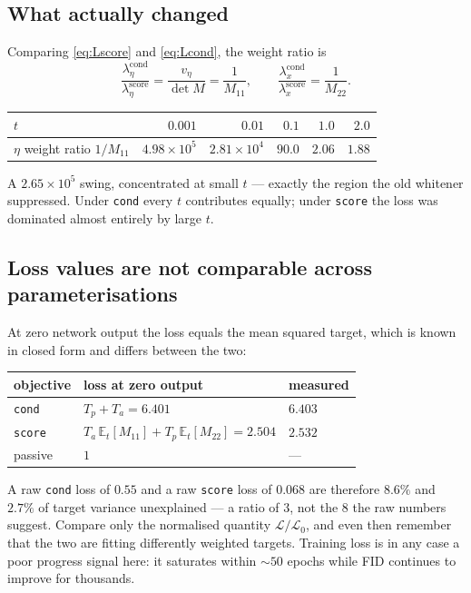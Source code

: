 \documentclass[11pt]{article}
\newcommand{\Tp}{T_p}
\newcommand{\Ta}{T_a}
\begin{document}
\subsection{What actually changed}

Comparing \eqref{eq:Lscore} and \eqref{eq:Lcond}, the weight ratio is
\begin{equation}
\frac{\lambda^{\text{cond}}_\eta}{\lambda^{\text{score}}_\eta}
= \frac{v_\eta}{\det M} = \frac{1}{M_{11}},
\qquad
\frac{\lambda^{\text{cond}}_x}{\lambda^{\text{score}}_x} = \frac{1}{M_{22}} .
\end{equation}

\begin{center}\small
\begin{tabular}{lrrrrr}
\toprule
$t$ & $0.001$ & $0.01$ & $0.1$ & $1.0$ & $2.0$\\
\midrule
$\eta$ weight ratio $1/M_{11}$ & $4.98\times10^{5}$ & $2.81\times10^{4}$ & $90.0$ & $2.06$ & $1.88$\\
\bottomrule
\end{tabular}
\end{center}

\noindent
A $2.65\times10^{5}$ swing, concentrated at small $t$ --- exactly the region the old
whitener suppressed. Under \texttt{cond} every $t$ contributes equally; under
\texttt{score} the loss was dominated almost entirely by large $t$.

\subsection{Loss values are not comparable across parameterisations}

At zero network output the loss equals the mean squared target, which is known in closed
form and differs between the two:
\begin{center}
\begin{tabular}{lll}
\toprule
objective & loss at zero output & measured\\
\midrule
\texttt{cond}    & $\Tp+\Ta = 6.401$ & $6.403$\\
\texttt{score}   & $\Ta\,\mathbb{E}_t[M_{11}]+\Tp\,\mathbb{E}_t[M_{22}] = 2.504$ & $2.532$\\
passive          & $1$ & ---\\
\bottomrule
\end{tabular}
\end{center}
A raw \texttt{cond} loss of $0.55$ and a raw \texttt{score} loss of $0.068$ are therefore
$8.6\%$ and $2.7\%$ of target variance unexplained --- a ratio of $3$, not the $8$ the raw
numbers suggest. Compare only the normalised quantity $\mathcal{L}/\mathcal{L}_0$, and even
then remember that the two are fitting differently weighted targets. Training loss is in
any case a poor progress signal here: it saturates within $\sim50$ epochs while FID
continues to improve for thousands.
\end{document}
